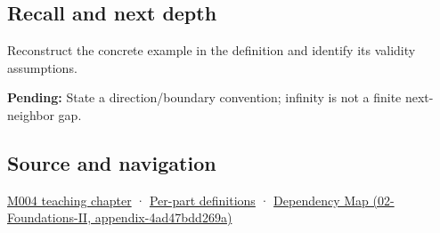 \subsection{Recall and next depth}\label{appendix-14bab4cab9d4-recall-and-next-depth}

Reconstruct the concrete example in the definition and identify its validity assumptions.

\textbf{Pending:} State a direction/boundary convention; infinity is not a finite next-neighbor gap.

\subsection{Source and navigation}\label{appendix-14bab4cab9d4-source-and-navigation}

\hyperref[01-foundations-i-ch001-a-stretching-ruler-for-real-valued-quantities]{M004 teaching chapter} · \hyperref[appendix-fd090d982a15-m004---parts-61-76]{Per-part definitions} · \href{../02-Foundations-II/main.pdf\#nameddest=appendix-4ad47bdd269a}{Dependency Map (02-Foundations-II, appendix-4ad47bdd269a)}
